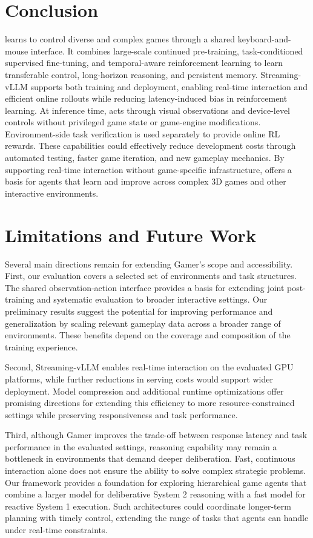 
\section{Conclusion}

\ourmodel learns to control diverse and complex games through a shared keyboard-and-mouse interface. It combines large-scale continued pre-training, task-conditioned supervised fine-tuning, and temporal-aware reinforcement learning to learn transferable control, long-horizon reasoning, and persistent memory. Streaming-vLLM supports both training and deployment, enabling real-time interaction and efficient online rollouts while reducing latency-induced bias in reinforcement learning. At inference time, \ourmodel acts through visual observations and device-level controls without privileged game state or game-engine modifications. Environment-side task verification is used separately to provide online RL rewards. These capabilities could effectively reduce development costs through automated testing, faster game iteration, and new gameplay mechanics. By supporting real-time interaction without game-specific infrastructure, \ourmodel offers a basis for agents that learn and improve across complex 3D games and other interactive environments.

\section{Limitations and Future Work}

Several main directions remain for extending Gamer’s scope and accessibility. First, our evaluation covers a selected set of environments and task structures. The shared observation-action interface provides a basis for extending joint post-training and systematic evaluation to broader interactive settings. Our preliminary results suggest the potential for improving performance and generalization by scaling relevant gameplay data across a broader range of environments. These benefits depend on the coverage and composition of the training experience. 

Second, Streaming-vLLM enables real-time interaction on the evaluated GPU platforms, while further reductions in serving costs would support wider deployment. Model compression and additional runtime optimizations offer promising directions for extending this efficiency to more resource-constrained settings while preserving responsiveness and task performance.

Third, although Gamer improves the trade-off between response latency and task performance in the evaluated settings, reasoning capability may remain a bottleneck in environments that demand deeper deliberation. Fast, continuous interaction alone does not ensure the ability to solve complex strategic problems. Our framework provides a foundation for exploring hierarchical game agents that combine a larger model for deliberative System 2 reasoning with a fast model for reactive System 1 execution. Such architectures could coordinate longer-term planning with timely control, extending the range of tasks that agents can handle under real-time constraints.

